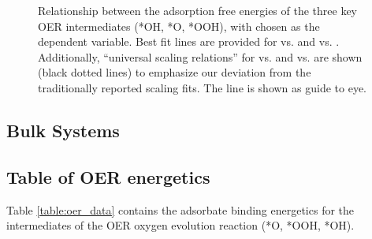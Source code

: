 \begin{figure}[!htb]
\centering
\caption{\label{fig:scaling_relations}
Relationship between the adsorption free energies of the three key OER intermediates (*OH, *O, *OOH), with \DGOH chosen as the dependent variable.
%
Best fit lines are provided for \DGOOH vs. \DGOH and \DGO vs. \DGOH.
%
Additionally, ``universal scaling relations'' for \DGOOH vs. \DGOH and \DGO vs. \DGOH are shown (black dotted lines) to emphasize our deviation from the traditionally reported scaling fits.
%
The \DGOH line is  shown as guide to eye.
}
\end{figure}



\subsection{Bulk Systems}  %
%



\subsection{Table of OER energetics}  %
%
%
Table \ref{table:oer_data} contains the adsorbate binding energetics for the intermediates of the OER
oxygen evolution reaction (*O, *OOH, *OH).


